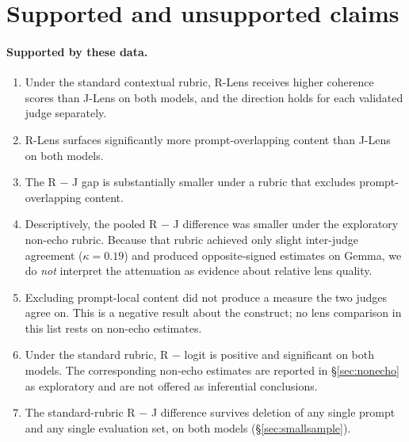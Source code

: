 \documentclass[11pt]{article}
\begin{document}
\section{Supported and unsupported claims}
\label{sec:claims}

\paragraph{Supported by these data.}
\begin{enumerate}[leftmargin=*,itemsep=1pt]
\item Under the standard contextual rubric, R-Lens receives higher coherence
      scores than J-Lens on both models, and the direction holds for each
      validated judge separately.
\item R-Lens surfaces significantly more prompt-overlapping content than J-Lens
      on both models.
\item The R $-$ J gap is substantially smaller under a rubric that excludes
      prompt-overlapping content.
\item Descriptively, the pooled R $-$ J difference was smaller under the
      exploratory non-echo rubric. Because that rubric achieved only slight
      inter-judge agreement ($\kappa = 0.19$) and produced opposite-signed
      estimates on Gemma, we do \emph{not} interpret the attenuation as evidence
      about relative lens quality.
\item Excluding prompt-local content did not produce a measure the two judges
      agree on. This is a negative result about the construct; no lens
      comparison in this list rests on non-echo estimates.
\item Under the standard rubric, R $-$ logit is positive and significant on
      both models. The corresponding non-echo estimates are reported in
      \S\ref{sec:nonecho} as exploratory and are not offered as inferential
      conclusions.
\item The standard-rubric R $-$ J difference survives deletion of any single
      prompt and any single evaluation set, on both models
      (\S\ref{sec:smallsample}).
\end{enumerate}
\end{document}
